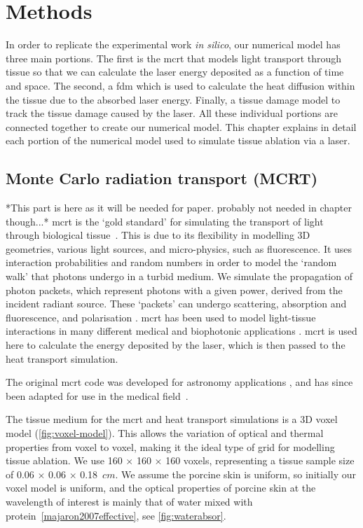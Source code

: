 \section{Methods}

In order to replicate the experimental work \textit{in silico}, our numerical model has three main portions. The first is the \gls{mcrt} that models light transport through tissue so that we can calculate the laser energy deposited as a function of time and space. The second, a \gls{fdm} which is used to calculate the heat diffusion within the tissue due to the absorbed laser energy. Finally, a tissue damage model to track the tissue damage caused by the laser. All these individual portions are connected together to create our numerical model. This chapter explains in detail each portion of the numerical model used to simulate tissue ablation via a laser.

\subsection{Monte Carlo radiation transport (MCRT)}

*This part is here as it will be needed for paper. probably not needed in chapter though...*
\gls{mcrt} is the `gold standard' for simulating the transport of light through biological tissue~\cite{kong2008efficient,wang1995mcml}. This is due to its flexibility in modelling 3D geometries, various light sources, and micro-physics, such as fluorescence. It uses interaction probabilities and random numbers in order to model the `random walk' that photons undergo in a turbid medium. We simulate the propagation of photon packets, which represent photons with a given power, derived from the incident radiant source. These `packets' can undergo scattering, absorption and fluorescence, and polarisation \cite{yao1999monte,welch1997propagation,wood1999model}. \gls{mcrt} has been used to model light-tissue interactions in many different medical and biophotonic applications \cite{campbell2015monte,boas2002three,patwardhan2005monte}. \gls{mcrt} is used here to calculate the energy deposited by the laser, which is then passed to the heat transport simulation.

The original \gls{mcrt} code was developed for astronomy applications \cite{wood1999model,wood2005estimating}, and has since been adapted for use in the medical field~\cite{campbell2015monte,barnard2018quantifying}.

The tissue medium for the \gls{mcrt} and heat transport simulations is a 3D voxel model (\cref{fig:voxel-model}). This allows the variation of optical and thermal properties from voxel to voxel, making it the ideal type of grid for modelling tissue ablation. We use  160 $\times$ 160 $\times$ 160 voxels, representing a tissue sample size of 0.06 $\times$ 0.06 $\times$ 0.18~$cm$. We assume the porcine skin is uniform, so initially our voxel model is uniform, and the optical properties of porcine skin at the wavelength of interest is mainly that of water mixed with protein~\cref{majaron2007effective}, see \cref{fig:waterabsor}.


